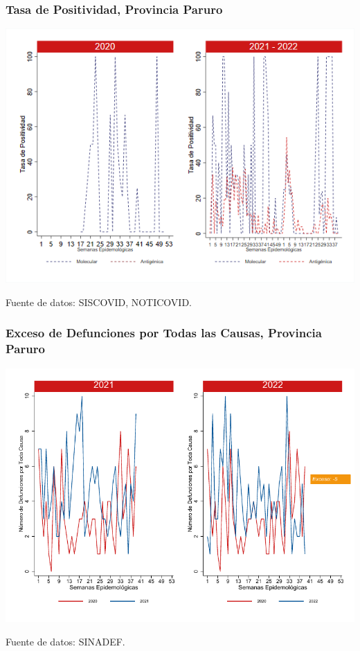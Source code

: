 \documentclass[xcolor=table]{beamer}
\begin{document}
\begin{frame}
	\frametitle{Tasa de Positividad, Provincia Paruro}
	\vspace{-.5cm}
	\begin{center}
		\includegraphics[width=0.8\linewidth, trim={0cm .5cm 0cm 0.2cm},clip]{../figuras/positividad_20_21_10.png}
	\end{center}
	{\tiny Fuente de datos: SISCOVID, NOTICOVID.}
\end{frame}

\begin{frame}
	\frametitle{Exceso de Defunciones por Todas las Causas, Provincia Paruro}
	\vspace{-.5cm}
	\begin{center}
		\includegraphics[width=0.8\linewidth, trim={0cm .5cm 0cm 0.2cm},clip]{../figuras/exceso_10.pdf}
	\end{center}
	{\tiny Fuente de datos: SINADEF.}
	
	\hyperlink{indicadores_provinciales}{}
\end{frame}
\end{document}

